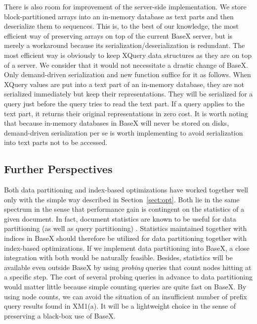There is also room for improvement of the server-side implementation. We store
block-partitioned arrays into an in-memory database as text parts and then
deserialize them to sequences. This is, to the best of our knowledge, the most
efficient way of preserving arrays on top of the current BaseX server, but is
merely a workaround because its serialization/deserialization is redundant. The
most efficient way is obviously to keep XQuery data structures as they are on
top of a server. We consider that it would not necessitate a drastic change of
BaseX. Only demand-driven serialization and new function 
suffice for it as follows. When XQuery values are put into a text part of an
in-memory database, they are not serialized immediately but keep their
representations. They will be serialized for a query just before the query tries
to read the text part. If a query applies  to the text part, it
returns their original representations in zero cost. It is worth noting that
because in-memory databases in BaseX will never be stored on disks,
demand-driven serialization per se is worth implementing to avoid serialization
into text parts not to be accessed.

\subsection{Further Perspectives}

Both data partitioning and index-based optimizations have worked together well
only with the simple way described in Section~\ref{sect:opt}. Both lie in the
same spectrum in the sense that performance gain is contingent on the statistics
of a given document. In fact, document statistics are known to be useful for
data partitioning (as well as query partitioning)
\cite{Bord10}. Statistics maintained together with indices
in BaseX should therefore be utilized for data partitioning together with
index-based optimizations. If we implement data partitioning into BaseX, a close
integration with both would be naturally feasible. Besides, statistics will be
available even outside BaseX by using \emph{probing} queries that count nodes
hitting at a specific step. The cost of several probing queries in advance to
data partitioning would matter little because simple counting queries are quite
fast on BaseX.  By using node counts, we can avoid the situation of an
insufficient number of prefix query results found in XM1(a). It will be a
lightweight choice in the sense of preserving a black-box use of BaseX.

